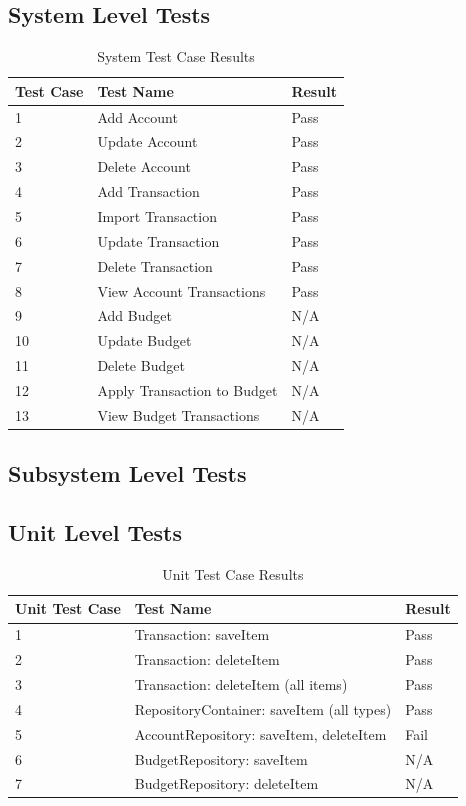 \documentclass[12pt]{article}
\begin{document}
\subsection{System Level Tests}
\begin{table}[htbp]
\centering
\caption {System Test Case Results}
\label{test-result}
\begin{tabularx}{\textwidth}{ | l | X | l |}
\hline
\textbf{Test Case}  &\textbf {Test Name}   &  \textbf{Result}                         \\ \hline
1 & Add Account &  Pass				\\ \hline
2 & Update Account & Pass 			\\ \hline
3 & Delete Account & Pass				\\ \hline
4 & Add Transaction & Pass			\\ \hline
5 & Import Transaction &	Pass	 		\\ \hline
6 & Update Transaction &	Pass			\\ \hline
7 & Delete Transaction & 	Pass			\\ \hline
8 & View Account Transactions & Pass		 \\ \hline
9 & Add Budget & N/A				\\ \hline
10 & Update Budget & N/A			\\ \hline
11 & Delete Budget & N/A				\\ \hline
12 & Apply Transaction to Budget & N/A	\\ \hline
13 & View Budget Transactions & N/A		\\ \hline
\end{tabularx}
\end{table}
\clearpage

\subsection {Subsystem Level Tests}

\subsection {Unit Level Tests}
\begin{table}[htbp]
\centering
\caption {Unit Test Case Results}
\label{test-result}
\begin{tabularx}{\textwidth}{ | l | X | l |}
\hline
\textbf{Unit Test Case}  &\textbf{Test Name}    &  \textbf{Result}                         \\ \hline
1 & Transaction: saveItem & Pass		 		\\ \hline
2 & Transaction: deleteItem & Pass 				\\ \hline
3 & Transaction: deleteItem (all items)& Pass 			\\ \hline
4 & RepositoryContainer: saveItem (all types) & Pass	 \\ \hline
5 & AccountRepository: saveItem, deleteItem & Fail 		\\ \hline
6 & BudgetRepository: saveItem & N/A 				\\ \hline
7 & BudgetRepository: deleteItem & N/A 			\\ \hline
\end{tabularx}
\end{table}
\clearpage
\end{document}
